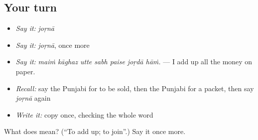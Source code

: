 \subsection*{Your turn}
\begin{itemize}
\raggedright
  \item \emph{Say it:} \emph{joṛnā}
  \item \emph{Say it:} \emph{joṛnā}, once more
  \item \emph{Say it:} \emph{maiṁ kāghaz utte sabh paise joṛdā hāṁ.} — I add up all the money on paper.
  \item \emph{Recall:} say the Punjabi for to be sold, then the Punjabi for a packet, then say \emph{joṛnā} again
  \item \emph{Write it:} copy \textbf{} once, checking the whole word
\end{itemize}

\begin{tcolorbox}[breakable,colback=teal!4,colframe=teal!35!black,title={Before you move on}]
What does  mean? (\textquotedblleft{}To add up; to join\textquotedblright{}.) Say it once more.
\end{tcolorbox}
